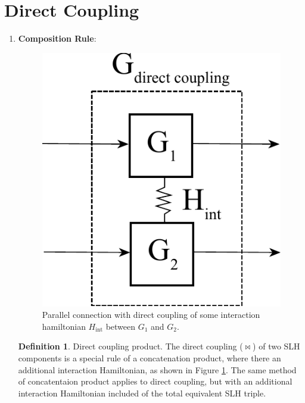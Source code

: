 \documentclass[a4paper]{article}
\theoremstyle{definition}
\newtheorem{definition}{Definition}[section]
\begin{document}
\section*{Direct Coupling}
\begin{enumerate}[label=(\roman*)]
\item 
\textbf{Composition Rule}: 
\begin{figure}[H]
\centering
\includegraphics[width = 7.5 cm]{Direct_coupling.pdf}
\caption{Parallel connection with direct coupling of some interaction hamiltonian $H_{\text{int}}$ between $G_1$ and $G_2$. 
}
\label{fig:direct_coupling}
\end{figure}  
\begin{definition}
Direct coupling product. The direct coupling  ($\bowtie$)  of two SLH components is a special rule of a concatenation product, where there an additional interaction Hamiltonian, as shown in Figure \ref{fig:direct_coupling}. The same method of concatentaion product applies to direct coupling, but with an additional interaction Hamiltonian included of the total equivalent SLH triple. 


\end{definition}
\end{enumerate}
\end{document}
